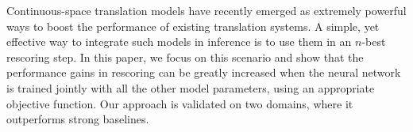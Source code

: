 Continuous-space translation models have recently emerged as extremely powerful ways to boost the performance of existing translation systems. A simple, yet effective way to integrate such models in inference is to use them in an $n$-best rescoring step. In this paper, we focus on this scenario and show that the performance gains in rescoring can be greatly increased when the neural network is trained jointly with all the other model parameters, using an appropriate objective function. Our approach is validated on two domains, where it outperforms strong baselines.
